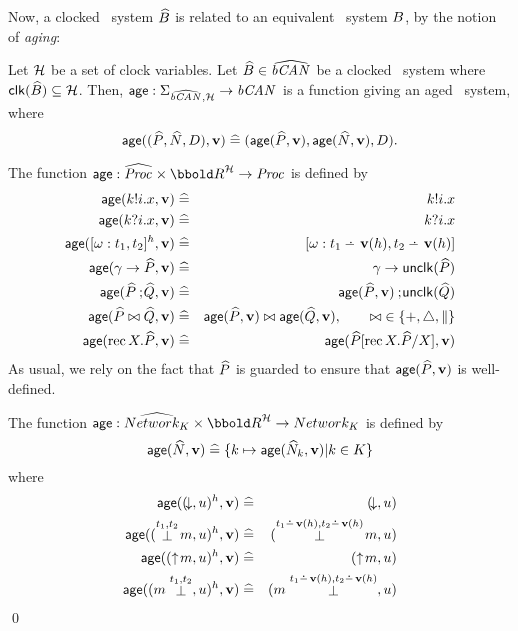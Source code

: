 Now, a clocked \bcandle\ system ${\widehat{{B}}}$ is related to an equivalent 
\bcandle\ system ${B}$, by the notion of \emph{aging}:
\begin{definition}[Aging]\label{def:pfage}
Let $\clocks$ be a set of clock variables.
Let ${\widehat{{B}}} \in {\widehat{{\text{\it bCAN\/}_{}}}}$ be a clocked \bcandle\ system
where $\clk(\csys) \subseteq \clocks$. Then, 
$\age : \States_{\CSys{},\clocks} \fun \Sys{}$ 
is a function giving an aged \bcandle\ system, where
\[\mathop{\sf age}(({\widehat{P}},{\widehat{N}},{D}),\mathbf{v}) \mathrel{\widehat=}
(\mathop{\sf age}({\widehat{P}},\mathbf{v}),\mathop{\sf age}({\widehat{N}},\mathbf{v}),{D}).\]

The function $\age : \CProc{} \cross \clkvls \fun \Proc{}$ is defined by
\begin{eqnarray*}
\age(\kk!\ii.\xx,\clkvl) & \defs & \kk!\ii.\xx \\
\age(\kk?\ii.\xx,\clkvl) & \defs & \kk?\ii.\xx \\
\age([\op:\ti_1,\ti_2]^\clock,\clkvl) & \defs & [\op:\ti_1\nmin\clkvl(\clock),\ti_2\nmin\clkvl(\clock)] \\
\age(\g\guard\PP,\clkvl) & \defs & \g\guard\unclk(\PP) \\
\age(\PP\sq\QQ,\clkvl) & \defs & \age(\PP,\clkvl) \sq \unclk(\QQ) \\
\age(\PP\genop\QQ,\clkvl) & \defs & \age(\PP,\clkvl) \genop \age(\QQ,\clkvl),\qquad \genop\; \in \{\choice,\interrupt,\parallel\} \\
\age(\rec X.\PP,\clkvl) & \defs & \age(\PP[\rec X.\PP/X],\clkvl)  
\end{eqnarray*}
As usual, we rely on the fact that ${\widehat{P}}$ is guarded to ensure that
$\mathop{\sf age}({\widehat{P}},\mathbf{v})$ is well-defined.

The function $\age : \NNetwork{\K} \cross \clkvls \fun \Network{\K}$
is defined by 
\[\mathop{\sf age}({\widehat{N}},\mathbf{v}) \mathrel{\widehat=} 
\{{k} \mapsto \mathop{\sf age}({\widehat{N}}_{k},\mathbf{v}) | {k} \in {K}\}\] 
where
\begin{eqnarray*}
\age((\free,\mq)^\clock,\clkvl) & \defs & (\free,\mq) \\
\age((\preact{\ti_1,\ti_2}{\mm},\mq)^\clock,\clkvl) & \defs & (\preact{\ti_1\nmin\clkvl(\clock),\ti_2\nmin\clkvl(\clock)}{\mm},\mq) \\
\age((\offers{\mm},\mq)^\clock,\clkvl) & \defs & (\offers{\mm},\mq) \\
\age((\postact{\ti_1,\ti_2}{\mm},\mq)^\clock,\clkvl) & \defs & (\postact{\ti_1\nmin\clkvl(\clock),\ti_2\nmin\clkvl(\clock)}{\mm},\mq) 
\end{eqnarray*}
\qed
\end{definition}

